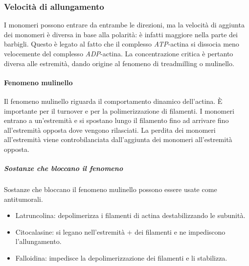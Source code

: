		\subsubsection{Velocit\`a di allungamento}
		I monomeri possono entrare da entrambe le direzioni, ma la velocit\`a di aggiunta dei monomeri \`e diversa in base alla polarit\`a: \`e infatti maggiore nella parte dei barbigli.
		Questo \`e legato al fatto che il complesso \emph{ATP}-actina si dissocia meno velocemente del complesso \emph{ADP}-actina.
		La concentrazione critica \`e pertanto diversa alle estremit\`a, dando origine al fenomeno di treadmilling o mulinello.

			\paragraph{Fenomeno mulinello}
			Il fenomeno mulinello riguarda il comportamento dinamico dell'actina.
			\`E importante per il  turnover e per la polimerizzazione di filamenti.
			I monomeri entrano a un'estremit\`a e si spostano lungo il filamento fino ad arrivare fino all'estremit\`a opposta dove vengono rilasciati.
			La perdita dei monomeri all'estremit\`a viene controbilanciata dall'aggiunta dei monomeri all'estremit\`a opposta.

				\subparagraph{Sostanze che bloccano il fenomeno}
				Sostanze che bloccano il fenomeno mulinello possono essere usate come antitumorali.
				\begin{multicols}{2}
					\begin{itemize}
						\item Latruncolina: depolimerizza i filamenti di actina destabilizzando le subunit\`a.
						\item Citocalasine: si legano nell'estremit\`a $+$ dei filamenti e ne impediscono l'allungamento.
						\item Falloidina: impedisce la depolimerizzazione dei filamenti e li stabilizza.
					\end{itemize}
				\end{multicols}

